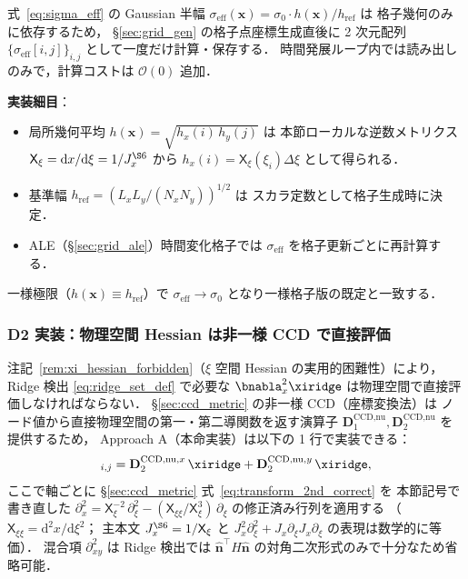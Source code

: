 式~\eqref{eq:sigma_eff} の Gaussian 半幅
$\sigma_\text{eff}(\bm{x}) = \sigma_0 \cdot h(\bm{x})/h_\text{ref}$ は
格子幾何のみに依存するため，
\S\ref{sec:grid_gen} の格子点座標生成直後に 2 次元配列
$\{\sigma_\text{eff}[i,j]\}_{i,j}$ として一度だけ計算・保存する．
時間発展ループ内では読み出しのみで，計算コストは $\mathcal{O}(0)$ 追加．

\noindent\textbf{実装細目}：
\begin{itemize}
  \item 局所幾何平均 $h(\bm{x}) = \sqrt{h_x(i)\,h_y(j)}$ は
        本節ローカルな逆数メトリクス
        $\mathsf{X}_\xi = \mathrm{d}x/\mathrm{d}\xi = 1/J_x^{\S6}$ から
        $h_x(i) = \mathsf{X}_\xi(\xi_i)\Delta\xi$ として得られる．
  \item 基準幅 $h_\text{ref} = (L_x L_y / (N_x N_y))^{1/2}$ は
        スカラ定数として格子生成時に決定．
  \item ALE（\S\ref{sec:grid_ale}）時間変化格子では
        $\sigma_\text{eff}$ を格子更新ごとに再計算する．
\end{itemize}

一様極限（$h(\bm{x}) \equiv h_\text{ref}$）で
$\sigma_\text{eff} \to \sigma_0$ となり一様格子版の既定と一致する．

\subsubsection{D2 実装：物理空間 Hessian は非一様 CCD で直接評価}
\label{sec:ridge_nu_hessian_impl}

注記~\ref{rem:xi_hessian_forbidden}（$\xi$ 空間 Hessian の実用的困難性）により，
Ridge 検出 \eqref{eq:ridge_set_def} で必要な
$\bnabla_x^2 \xiridge$ は物理空間で直接評価しなければならない．
\S\ref{sec:ccd_metric} の非一様 CCD（座標変換法）は
ノード値から直接物理空間の第一・第二導関数を返す演算子
$\mathbf{D}_1^\text{CCD,nu}, \mathbf{D}_2^\text{CCD,nu}$ を提供するため，
Approach A（本命実装）は以下の 1 行で実装できる：
\begin{equation}
  [\bnabla_x^2 \xiridge]_{i,j}
  = \mathbf{D}_2^{\text{CCD,nu},x}\,\xiridge
  + \mathbf{D}_2^{\text{CCD,nu},y}\,\xiridge,
  \label{eq:ridge_nu_hessian}
\end{equation}
ここで軸ごとに \S\ref{sec:ccd_metric} 式~\eqref{eq:transform_2nd_correct} を
本節記号で書き直した
$\partial_x^2 = \mathsf{X}_\xi^{-2}\,\partial_\xi^2
  - (\mathsf{X}_{\xi\xi}/\mathsf{X}_\xi^3)\,\partial_\xi$
の修正済み行列を適用する
（$\mathsf{X}_{\xi\xi} = \mathrm{d}^2 x/\mathrm{d}\xi^2$；
主本文 $J_x^{\S6} = 1/\mathsf{X}_\xi$ と $J_x^2 \partial_\xi^2 + J_x\partial_\xi J_x \partial_\xi$
の表現は数学的に等価）．
混合項 $\partial_{xy}^2$ は Ridge 検出では $\hat{\bm{n}}^{\!\top}H\hat{\bm{n}}$
の対角二次形式のみで十分なため省略可能．

